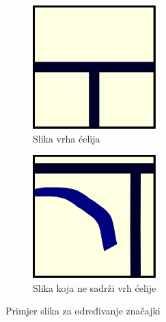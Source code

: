 \documentclass[times, utf8, zavrsni, numeric]{fer}
\begin{document}
\begin{figure}[th!]
    \centering
    \begin{subfigure}{.5\textwidth}
        \centering
        \includegraphics[width=.45\linewidth]{Images/Feature_true_0.png}
        \captionsetup{justification=centering}
        \caption{Slika vrha ćelija}
        \label{fig:featureDemo0a}
    \end{subfigure}%
    \begin{subfigure}{.5\textwidth}
        \centering
        \includegraphics[width=.45\linewidth]{Images/Feature_false_0.png}
        \captionsetup{justification=centering}
        \caption{Slika koja ne sadrži vrh ćelije}
        \label{fig:featureDemo0b}
    \end{subfigure}
    \caption{Primjer slika za određivanje značajki}
    \label{fig:featureDemo0}
\end{figure}
\end{document}
